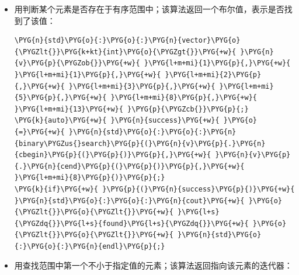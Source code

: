 \begin{itemize}

\item 用判断某个元素是否存在于有序范围中；该算法返回一个布尔值，表示是否找到了该值：



\begin{codeblockbg}
\begin{Verbatim}[commandchars=\\\{\},breaklines=true,breakanywhere=true,fontsize=\codefont,xleftmargin=17bp]
\PYG{n}{std}\PYG{o}{:}\PYG{o}{:}\PYG{n}{vector}\PYG{o}{\PYGZlt{}}\PYG{k+kt}{int}\PYG{o}{\PYGZgt{}}\PYG{+w}{ }\PYG{n}{v}\PYG{p}{\PYGZob{}}\PYG{+w}{ }\PYG{l+m+mi}{1}\PYG{p}{,}\PYG{+w}{ }\PYG{l+m+mi}{1}\PYG{p}{,}\PYG{+w}{ }\PYG{l+m+mi}{2}\PYG{p}{,}\PYG{+w}{ }\PYG{l+m+mi}{3}\PYG{p}{,}\PYG{+w}{ }\PYG{l+m+mi}{5}\PYG{p}{,}\PYG{+w}{ }\PYG{l+m+mi}{8}\PYG{p}{,}\PYG{+w}{ }\PYG{l+m+mi}{13}\PYG{+w}{ }\PYG{p}{\PYGZcb{}}\PYG{p}{;}
\PYG{k}{auto}\PYG{+w}{ }\PYG{n}{success}\PYG{+w}{ }\PYG{o}{=}\PYG{+w}{ }\PYG{n}{std}\PYG{o}{:}\PYG{o}{:}\PYG{n}{binary\PYGZus{}search}\PYG{p}{(}\PYG{n}{v}\PYG{p}{.}\PYG{n}{cbegin}\PYG{p}{(}\PYG{p}{)}\PYG{p}{,}\PYG{+w}{ }\PYG{n}{v}\PYG{p}{.}\PYG{n}{cend}\PYG{p}{(}\PYG{p}{)}\PYG{p}{,}\PYG{+w}{ }\PYG{l+m+mi}{8}\PYG{p}{)}\PYG{p}{;}
\PYG{k}{if}\PYG{+w}{ }\PYG{p}{(}\PYG{n}{success}\PYG{p}{)}\PYG{+w}{ }\PYG{n}{std}\PYG{o}{:}\PYG{o}{:}\PYG{n}{cout}\PYG{+w}{ }\PYG{o}{\PYGZlt{}}\PYG{o}{\PYGZlt{}}\PYG{+w}{ }\PYG{l+s}{\PYGZdq{}}\PYG{l+s}{found}\PYG{l+s}{\PYGZdq{}}\PYG{+w}{ }\PYG{o}{\PYGZlt{}}\PYG{o}{\PYGZlt{}}\PYG{+w}{ }\PYG{n}{std}\PYG{o}{:}\PYG{o}{:}\PYG{n}{endl}\PYG{p}{;}
\end{Verbatim}
\end{codeblockbg}



\item 用查找范围中第一个不小于指定值的元素；该算法返回指向该元素的迭代器：




\end{itemize}

